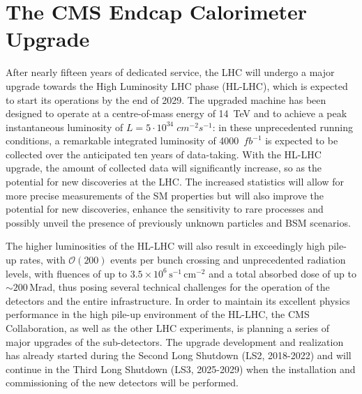 



\chapter{The CMS Endcap Calorimeter Upgrade}
\label{chapter:The CMS Endcap Calorimeter Upgrade}

After nearly fifteen years of dedicated service, the LHC will undergo a major upgrade towards the High Luminosity LHC phase (HL-LHC), which is expected to start its operations by the end of 2029.
The upgraded machine has been designed to operate at a  centre-of-mass energy of 14~TeV and to achieve a peak instantaneous luminosity of $L=5\cdot10^{34}\;cm^{-2}s^{-1}$: in these unprecedented running conditions, a remarkable integrated luminosity of 4000~$fb^{-1}$ is expected to be collected over the anticipated ten years of data-taking. 
With the HL-LHC upgrade, the amount of collected data will significantly increase, so as the potential for new discoveries at the LHC. The increased statistics will allow for more precise measurements of the SM properties but will also improve the potential for new discoveries, enhance the sensitivity to rare processes and possibly unveil the presence of previously unknown particles and BSM scenarios.

The higher luminosities of the HL-LHC will also result in exceedingly high pile-up rates, with $\mathcal{O}(200)$ events per bunch crossing and unprecedented radiation levels, with fluences of up to $3.5\times10^6\,\textrm{s}^{-1}\,\textrm{cm}^{-2}$ and a total absorbed dose of up to $\sim$$200\,\textrm{Mrad}$, thus posing several technical challenges for the operation of the detectors and the entire infrastructure.
In order to maintain its excellent physics performance in the high pile-up environment of the HL-LHC, the CMS Collaboration, as well as the other LHC experiments, is planning a series of major upgrades of the sub-detectors. The upgrade development and realization has already started during the Second Long Shutdown (LS2, 2018-2022) and will continue in the Third Long Shutdown (LS3, 2025-2029) when the installation and commissioning of the new detectors will be performed. 

